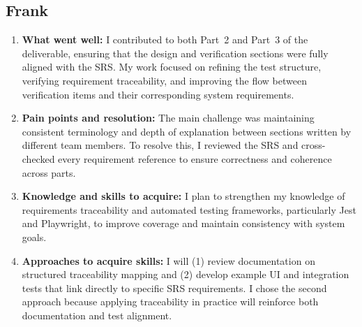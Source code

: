 \documentclass[12pt, titlepage]{article}
\begin{document}
\subsection*{Frank}
\begin{enumerate}
  \item \textbf{What went well:}
        I contributed to both Part~2 and Part~3 of the deliverable, ensuring that the design and verification
        sections were fully aligned with the SRS. My work focused on refining the test structure, verifying
        requirement traceability, and improving the flow between verification items and their
        corresponding system requirements.

  \item \textbf{Pain points and resolution:}
        The main challenge was maintaining consistent terminology and depth of explanation between
        sections written by different team members. To resolve this, I reviewed the SRS and cross-checked
        every requirement reference to ensure correctness and coherence across parts.

  \item \textbf{Knowledge and skills to acquire:}
        I plan to strengthen my knowledge of requirements traceability and automated testing frameworks,
        particularly Jest and Playwright, to improve coverage and maintain consistency with system goals.

  \item \textbf{Approaches to acquire skills:}
        I will (1) review documentation on structured traceability mapping and (2) develop example UI
        and integration tests that link directly to specific SRS requirements. I chose the second approach
        because applying traceability in practice will reinforce both documentation and test alignment.
\end{enumerate}
\end{document}
